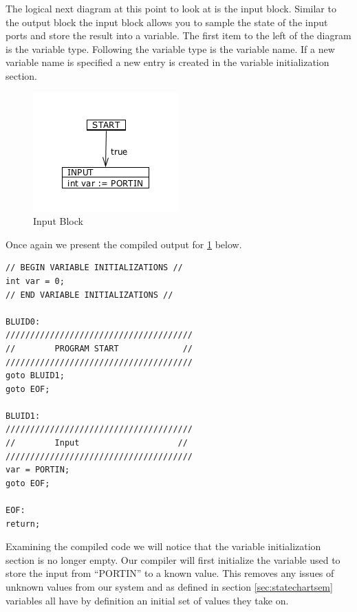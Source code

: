 The logical next diagram at this point to look at is the input block. Similar to the output block the input block allows you to sample the state of the input ports and store the result into a variable. The first item to the left of the diagram is the variable type. Following the variable type is the variable name. If a new variable name is specified a new entry is created in the variable initialization section. 


\begin{figure}[htb]
	\centering
	\includegraphics[width=\imgmedphoto]{./images/correctness_ex_input.png}
	\caption{Input Block}
	\label{fig:correctness_ex_input}
\end{figure}

Once again we present the compiled output for \ref{fig:correctness_ex_input} below.

\begin{minipage}{\textwidth}
\begin{lstlisting}[frame=single]
// BEGIN VARIABLE INITIALIZATIONS //
int var = 0;
// END VARIABLE INITIALIZATIONS //

BLUID0:
//////////////////////////////////////
//        PROGRAM START             //
//////////////////////////////////////
goto BLUID1;
goto EOF;

BLUID1:
//////////////////////////////////////
//        Input                    //
//////////////////////////////////////
var = PORTIN;
goto EOF;

EOF:
return;
\end{lstlisting}
\end{minipage}

Examining the compiled code we will notice that the variable initialization section is no longer empty. Our compiler will first initialize the variable used to store the input from ``PORTIN'' to a known value. This removes any issues of unknown values from our system and as defined in section \ref{sec:statechartsem} variables all have by definition an initial set of values they take on.



